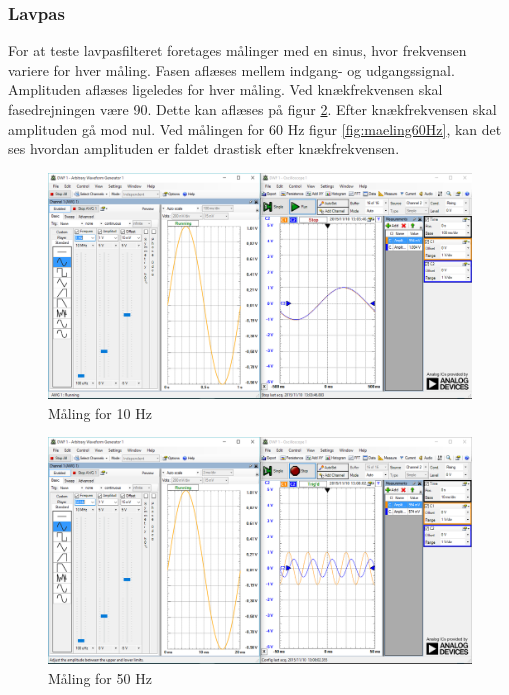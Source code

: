 \subsubsection{Lavpas}
For at teste lavpasfilteret foretages målinger med en sinus, hvor frekvensen variere for hver måling. Fasen aflæses mellem indgang- og udgangssignal. Amplituden aflæses ligeledes for hver måling. 
Ved knækfrekvensen skal fasedrejningen være 90\textdegree. Dette kan aflæses på figur \ref{fig:maeling50Hz}.
Efter knækfrekvensen skal amplituden gå mod nul. Ved målingen for 60 Hz figur \ref{fig:maeling60Hz}, kan det ses hvordan amplituden er faldet drastisk efter knækfrekvensen. 
\begin{figure}[H]
	\centering
	\includegraphics[width=1.0\textwidth]{Figurer/10Hz}
	\caption{Måling for 10 Hz}
	\label{fig:maeling10Hz}
\end{figure}

\begin{figure}[H]
	\centering
	\includegraphics[width=1.0\textwidth]{Figurer/50Hz}
	\caption{Måling for 50 Hz}
	\label{fig:maeling50Hz}
\end{figure}

